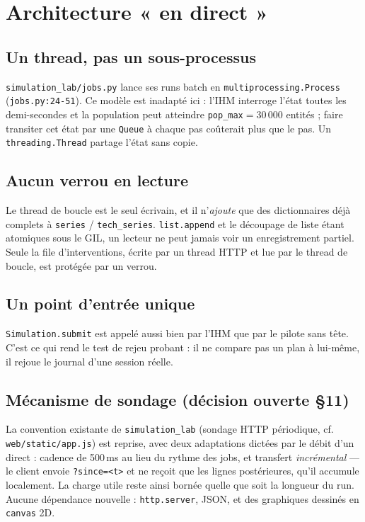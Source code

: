 \documentclass[11pt,a4paper]{article}
\newcommand{\code}[1]{\texttt{#1}}
\begin{document}
\section{Architecture « en direct »}

\subsection{Un thread, pas un sous-processus}

\code{simulation\_lab/jobs.py} lance ses runs batch en
\code{multiprocessing.Process} (\code{jobs.py:24-51}). Ce modèle est
inadapté ici : l'IHM interroge l'état toutes les demi-secondes et la
population peut atteindre \code{pop\_max}$=30\,000$ entités ; faire
transiter cet état par une \code{Queue} à chaque pas coûterait plus que le
pas. Un \code{threading.Thread} partage l'état sans copie.

\subsection{Aucun verrou en lecture}

Le thread de boucle est le seul écrivain, et il n'\emph{ajoute} que des
dictionnaires déjà complets à \code{series} / \code{tech\_series}.
\code{list.append} et le découpage de liste étant atomiques sous le GIL, un
lecteur ne peut jamais voir un enregistrement partiel. Seule la file
d'interventions, écrite par un thread HTTP et lue par le thread de boucle,
est protégée par un verrou.

\subsection{Un point d'entrée unique}

\code{Simulation.submit} est appelé aussi bien par l'IHM que par le pilote
sans tête. C'est ce qui rend le test de rejeu probant : il ne compare pas
un plan à lui-même, il rejoue le journal d'une session réelle.

\subsection{Mécanisme de sondage (décision ouverte §11)}

La convention existante de \code{simulation\_lab} (sondage HTTP périodique,
cf. \code{web/static/app.js}) est reprise, avec deux adaptations dictées
par le débit d'un direct : cadence de 500\,ms au lieu du rythme des jobs,
et transfert \emph{incrémental} --- le client envoie \code{?since=<t>} et
ne reçoit que les lignes postérieures, qu'il accumule localement. La charge
utile reste ainsi bornée quelle que soit la longueur du run. Aucune
dépendance nouvelle : \code{http.server}, JSON, et des graphiques dessinés
en \code{canvas} 2D.
\end{document}
